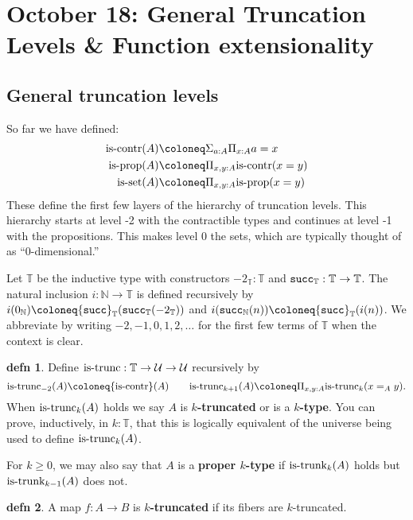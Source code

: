 \documentclass{amsart}
\theoremstyle{theorem}
\theoremstyle{definition}
\newtheorem*{defn}{defn}
\theoremstyle{remark}
\newcommand{\0}{\mathbbe{0}}
\newcommand{\1}{\mathbbe{1}}
\newcommand{\2}{\mathbbe{2}}
\newcommand{\3}{\mathbbe{3}}
\newcommand{\4}{\mathbbe{4}}
\newcommand{\term}[1]{{\textup{\texttt{#1}}}}
\newcommand{\type}[1]{{\textup{#1}}}
\newcommand{\bN}{{\mathbb{N}}}
\newcommand{\bT}{{\mathbb{T}}}
\newcommand{\suc}{\term{succ}_{\bN}}
\newcommand{\UU}{{\mathcal{U}}}
\newcommand{\is}[1]{\type{is-{#1}}}
\newcommand{\iscontr}{\type{is-contr}}
\newcommand{\isprop}{\type{is-prop}}
\begin{document}
\section*{October 18: General Truncation Levels \& Function extensionality}

\subsection*{General truncation levels}

So far we have defined:
\begin{align*}
\iscontr(A) &\coloneq \Sigma_{a:A} \Pi_{x:A} a=x\\
\isprop(A) &\coloneq \Pi_{x,y:A} \iscontr(x=y) \\
\is{set}(A) &\coloneq \Pi_{x,y:A} \isprop(x=y) 
\end{align*}
These define the first few layers of the hierarchy of truncation levels. This hierarchy starts at level -2 with the contractible types and continues at level -1 with the propositions. This makes level 0 the sets, which are typically thought of as ``0-dimensional.''

Let $\bT$ be the inductive type with constructors $-2_\bT : \bT$ and $\term{succ}_\bT : \bT \to \bT$. The natural inclusion $i \colon \bN \to \bT$ is defined recursively by $i(0_\bN) \coloneq \term{succ}_\bT (\term{succ}_\bT (-2_\bT))$ and $i(\suc(n)) \coloneq \term{succ}_\bT (i(n))$. We abbreviate by writing $-2,-1,0,1,2,\ldots$ for the first few terms of $\bT$ when the context is clear.

\begin{defn} Define $\is{trunc} : \bT \to \UU \to \UU$ recursively by
\[ \is{trunc}_{-2}(A) \coloneq \iscontr(A) \qquad \is{trunc}_{k+1}(A) \coloneq \Pi_{x,y:A} \is{trunc}_k(x=_Ay).\]
When $\is{trunc}_k(A)$ holds we say $A$ is \textbf{$k$-truncated} or is a \textbf{$k$-type}. You can prove, inductively, in $k : \bT$, that this is logically equivalent of the universe being used to define $\is{trunc}_k(A)$.
\end{defn}



For $k \geq 0$, we may also say that $A$ is a \textbf{proper $k$-type} if $\is{trunk}_k(A)$ holds but $\is{trunk}_{k-1}(A)$ does not.


\begin{defn} A map $f \colon A \to B$ is \textbf{$k$-truncated} if its fibers are $k$-truncated.
\end{defn}
\end{document}
